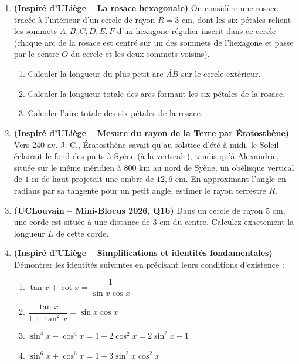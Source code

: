 \begin{enumerate}[label=\textbf{Exercice 1.\arabic* --}, align=left, leftmargin=*]
    \item \textbf{(Inspiré d'ULiège -- La rosace hexagonale)} On considère une rosace tracée à l'intérieur d'un cercle de rayon $R = 3\text{ cm}$, dont les six pétales relient les sommets $A, B, C, D, E, F$ d'un hexagone régulier inscrit dans ce cercle (chaque arc de la rosace est centré sur un des sommets de l'hexagone et passe par le centre $O$ du cercle et les deux sommets voisins).
    \begin{enumerate}
        \item Calculer la longueur du plus petit arc $\overset{\frown}{AB}$ sur le cercle extérieur.
        \item Calculer la longueur totale des arcs formant les six pétales de la rosace.
        \item Calculer l'aire totale des six pétales de la rosace.
    \end{enumerate}

    \item \textbf{(Inspiré d'ULiège -- Mesure du rayon de la Terre par Ératosthène)} Vers 240 av. J.-C., Ératosthène savait qu'au solstice d'été à midi, le Soleil éclairait le fond des puits à Syène (à la verticale), tandis qu'à Alexandrie, située sur le même méridien à $800\text{ km}$ au nord de Syène, un obélisque vertical de $1\text{ m}$ de haut projetait une ombre de $12,6\text{ cm}$. En approximant l'angle en radians par sa tangente pour un petit angle, estimer le rayon terrestre $R$.

    \item \textbf{(UCLouvain -- Mini-Blocus 2026, Q1b)} Dans un cercle de rayon $5\text{ cm}$, une corde est située à une distance de $3\text{ cm}$ du centre. Calculez exactement la longueur $L$ de cette corde.

    \item \textbf{(Inspiré d'ULiège -- Simplifications et identités fondamentales)} Démontrer les identités suivantes en précisant leurs conditions d'existence :
    \begin{enumerate}
        \item $\tan x + \cot x = \dfrac{1}{\sin x \cos x}$
        \item $\dfrac{\tan x}{1 + \tan^2 x} = \sin x \cos x$
        \item $\sin^4 x - \cos^4 x = 1 - 2\cos^2 x = 2\sin^2 x - 1$
        \item $\sin^6 x + \cos^6 x = 1 - 3\sin^2 x \cos^2 x$
    \end{enumerate}


\end{enumerate}
